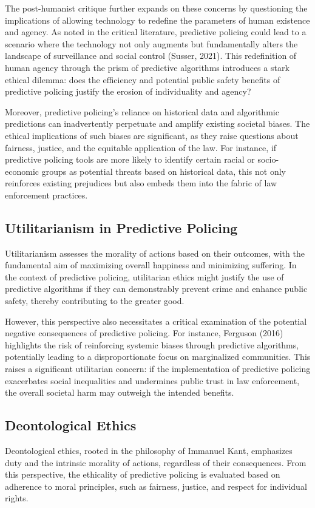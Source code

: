 \documentclass[man, noextraspace]{apa7} %
\begin{document}
The post-humanist critique further expands on these concerns by questioning the implications of allowing technology to redefine the parameters of human existence and agency. As noted in the critical literature, predictive policing could lead to a scenario where the technology not only augments but fundamentally alters the landscape of surveillance and social control (Susser, 2021). This redefinition of human agency through the prism of predictive algorithms introduces a stark ethical dilemma: does the efficiency and potential public safety benefits of predictive policing justify the erosion of individuality and agency?

Moreover, predictive policing's reliance on historical data and algorithmic predictions can inadvertently perpetuate and amplify existing societal biases. The ethical implications of such biases are significant, as they raise questions about fairness, justice, and the equitable application of the law. For instance, if predictive policing tools are more likely to identify certain racial or socio-economic groups as potential threats based on historical data, this not only reinforces existing prejudices but also embeds them into the fabric of law enforcement practices.


\subsection{Utilitarianism in Predictive Policing}
Utilitarianism assesses the morality of actions based on their outcomes, with the fundamental aim of maximizing overall happiness and minimizing suffering. In the context of predictive policing, utilitarian ethics might justify the use of predictive algorithms if they can demonstrably prevent crime and enhance public safety, thereby contributing to the greater good.

However, this perspective also necessitates a critical examination of the potential negative consequences of predictive policing. For instance, Ferguson (2016) highlights the risk of reinforcing systemic biases through predictive algorithms, potentially leading to a disproportionate focus on marginalized communities. This raises a significant utilitarian concern: if the implementation of predictive policing exacerbates social inequalities and undermines public trust in law enforcement, the overall societal harm may outweigh the intended benefits.

\subsection{Deontological Ethics}
Deontological ethics, rooted in the philosophy of Immanuel Kant, emphasizes duty and the intrinsic morality of actions, regardless of their consequences. From this perspective, the ethicality of predictive policing is evaluated based on adherence to moral principles, such as fairness, justice, and respect for individual rights.
\end{document}
